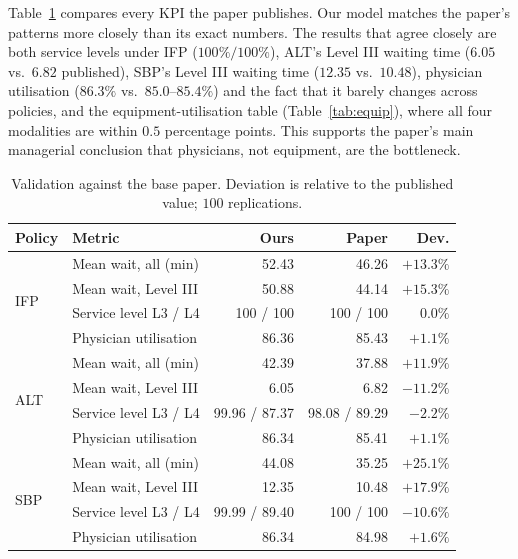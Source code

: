 \documentclass[sigconf,nonacm]{acmart}
\begin{document}
Table~\ref{tab:validate} compares every KPI the paper publishes. Our model
matches the paper's patterns more closely than its exact numbers. The results
that agree closely are both service levels under IFP ($100\%/100\%$), ALT's
Level III waiting time ($6.05$ vs.\ $6.82$ published), SBP's Level III waiting
time ($12.35$ vs.\ $10.48$), physician utilisation ($86.3\%$ vs.\
$85.0$--$85.4\%$) and the fact that it barely changes across policies, and the
equipment-utilisation table (Table~\ref{tab:equip}), where all four modalities
are within $0.5$ percentage points. This supports the paper's main managerial
conclusion that physicians, not equipment, are the bottleneck.

\begin{table}[t]
\caption{Validation against the base paper. Deviation is relative to the
         published value; $100$ replications.}
\label{tab:validate}
\small
\begin{tabular}{@{}llrrr@{}}
\toprule
\textbf{Policy} & \textbf{Metric} & \textbf{Ours} & \textbf{Paper} & \textbf{Dev.} \\
\midrule
\multirow{4}{*}{IFP}
 & Mean wait, all (min)   & 52.43  & 46.26  & $+13.3\%$ \\
 & Mean wait, Level III   & 50.88  & 44.14  & $+15.3\%$ \\
 & Service level L3 / L4  & 100 / 100 & 100 / 100 & $0.0\%$ \\
 & Physician utilisation  & 86.36  & 85.43  & $+1.1\%$ \\
\midrule
\multirow{4}{*}{ALT}
 & Mean wait, all (min)   & 42.39  & 37.88  & $+11.9\%$ \\
 & Mean wait, Level III   & 6.05   & 6.82   & $-11.2\%$ \\
 & Service level L3 / L4  & 99.96 / 87.37 & 98.08 / 89.29 & $-2.2\%$ \\
 & Physician utilisation  & 86.34  & 85.41  & $+1.1\%$ \\
\midrule
\multirow{4}{*}{SBP}
 & Mean wait, all (min)   & 44.08  & 35.25  & $+25.1\%$ \\
 & Mean wait, Level III   & 12.35  & 10.48  & $+17.9\%$ \\
 & Service level L3 / L4  & 99.99 / 89.40 & 100 / 100 & $-10.6\%$ \\
 & Physician utilisation  & 86.34  & 84.98  & $+1.6\%$ \\
\bottomrule
\end{tabular}
\end{table}
\end{document}
